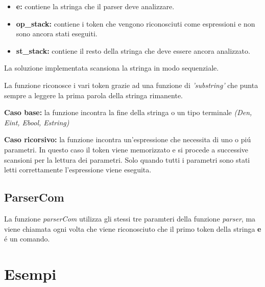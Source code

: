 \documentclass[a4paper,titlepage]{book}
\begin{document}
\begin{itemize}
\item \textbf{e:} contiene la stringa che il parser deve analizzare.
\item \textbf{op\_stack:} contiene i token che vengono riconosciuti come espressioni e non sono ancora stati eseguiti.
\item \textbf{st\_stack:} contiene il resto della stringa che deve essere ancora analizzato.
\end{itemize}
\clearpage
La soluzione implementata scansiona la stringa in modo sequenziale.

La funzione riconosce i vari token grazie ad una funzione di \textit{'substring'} che punta sempre a leggere la prima parola della stringa rimanente.

\textbf{Caso base:} la funzione incontra la fine della stringa o un tipo terminale \textit{(Den, Eint, Ebool, Estring)}

\textbf{Caso ricorsivo:} la funzione incontra un'espressione che necessita di uno o pi\'u parametri. In questo caso il token viene memorizzato e si procede a successive scansioni per la lettura dei parametri. Solo quando tutti i parametri sono stati letti correttamente l'espressione viene eseguita.

\section{ParserCom}
La funzione \textit{parserCom} utilizza gli stessi tre paramteri della funzione \textit{parser}, ma viene chiamata ogni volta che viene riconosciuto che il primo token della stringa \textbf{e} \'e un comando.

\chapter{Esempi}
\end{document}
